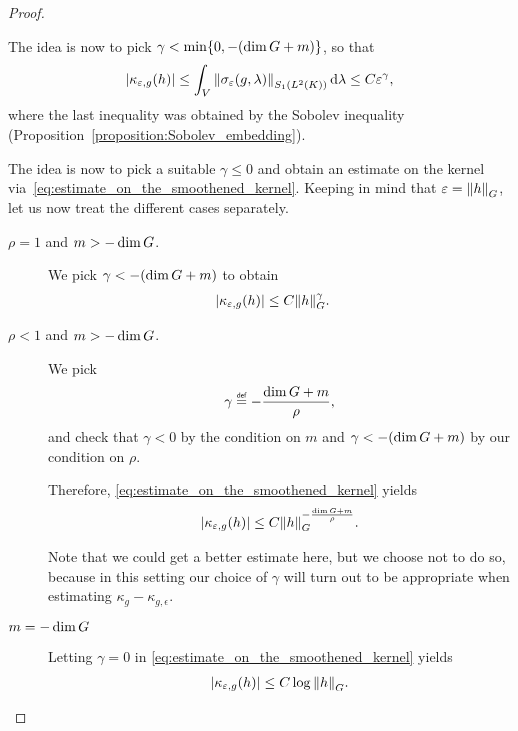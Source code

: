 \begin{proof}
\begin{description}
            The idea is now to pick $\gamma < \min \{0, -(\dim \Group + m)\}$, so that
            \begin{align}
                \abs{\kappa_{\epsilon, g}(h)}
                \leq \int_\VectorSpace \norm [\SchattenClasses 1 {\Lebesgue 2 \CompactGroup}] {\sigma_\epsilon(g, \lambda)} \dd \lambda
                \leq C
                \epsilon^{\gamma},
                \label{eq:estimate_on_the_smoothened_kernel}
            \end{align}
            where the last inequality was obtained by the Sobolev inequality (Proposition~\ref{proposition:Sobolev_embedding}).

            The idea is now to pick a suitable $\gamma \leq 0$ and obtain an estimate on the kernel via~\eqref{eq:estimate_on_the_smoothened_kernel}.
            Keeping in mind that $\epsilon = \norm [\Group] h$,
            let us now treat the different cases separately.
            \begin{description}
                \item[$\rho = 1$ and $m > -\dim \Group$.] We pick $\gamma < -(\dim \Group + m)$ to obtain
                    \begin{align*}
                        \abs {\kappa_{\epsilon, g}(h)}
                        &\leq C \norm [\Group] h^\gamma.
                    \end{align*}
                \item[$\rho < 1$ and $m > -\dim \Group$.]
                    We pick
                    \begin{align*}
                        \gamma \defeq -\frac {\dim \Group + m} \rho,
                    \end{align*}
                    and check that $\gamma < 0$ by the condition on $m$ and
                    $\gamma < -(\dim \Group + m)$ by our condition on $\rho$.

                    Therefore, \eqref{eq:estimate_on_the_smoothened_kernel} yields
                    \begin{align*}
                        \abs {\kappa_{\epsilon, g}(h)}
                        \leq C \norm [\Group] h^{-\frac {\dim \Group + m} {\rho}}.
                    \end{align*}

                    Note that we could get a better estimate here,
                    but we choose not to do so,
                    because in this setting our choice of $\gamma$ will turn out to be appropriate when estimating $\kappa_g - \kappa_{g, \epsilon}$.
                \item[$m = -\dim \Group$]
                    Letting $\gamma = 0$ in \eqref{eq:estimate_on_the_smoothened_kernel} yields
                    \begin{align*}
                        \abs {\kappa_{\epsilon, g}(h)}
                        \leq C \log \norm [\Group] h.
                    \end{align*}
            \end{description}


\end{description}
\end{proof}
